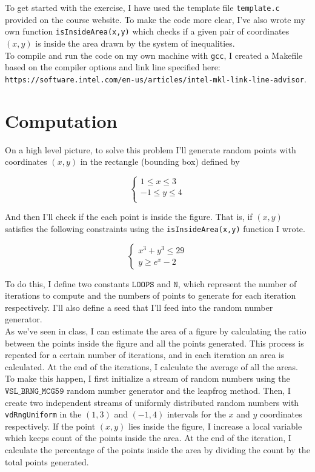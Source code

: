 \documentclass{article}
\newcommand{\code}{\texttt}
\begin{document}
To get started with the exercise, I have used the template file \code{template.c} provided on the course website. To make the code more clear, I've also wrote my own function \code{isInsideArea(x,y)} which checks if a given pair of coordinates $(x, y)$ is inside the area drawn by the system of inequalities.\\

To compile and run the code on my own machine with \code{gcc}, I created a Makefile based on the compiler options and link line specified here:\\ \code{https://software.intel.com/en-us/articles/intel-mkl-link-line-advisor}.

\section{Computation}
On a high level picture, to solve this problem I'll generate random points with coordinates $(x, y)$ in the rectangle (bounding box) defined by

$$
\begin{cases}
1 \le x \le 3 \\
-1\le y \le 4 \\  
\end{cases}$$

And then I'll check if the each point is inside the figure. That is, if $(x, y)$ satisfies the following constraints using the \code{isInsideArea(x,y)} function I wrote.

$$
\begin{cases}
x^3+y^3\le 29 \\
y \ge e^x -2
\end{cases}$$

To do this, I define two constants $\code{LOOPS}$ and $\code{N}$, which represent the number of iterations to compute and the numbers of points to generate for each iteration respectively. I'll also define a seed that I'll feed into the random number generator.\\

As we've seen in class, I can estimate the area of a figure by calculating the ratio between the points inside the figure and all the points generated. This process is repeated for a certain number of iterations, and in each iteration an area is calculated. At the end of the iterations, I calculate the average of all the areas.\\

To make this happen, I first initialize a stream of random numbers using the $\code{VSL\_BRNG\_MCG59}$ random number generator and the leapfrog method. Then, I create two independent streams of uniformly distributed random numbers with \code{vdRngUniform} in the $(1,3)$ and $(-1,4)$ intervals for the $x$ and $y$ coordinates respectively. If the point $(x, y)$ lies inside the figure, I increase a local variable which keeps count of the points inside the area. At the end of the iteration, I calculate the percentage of the points inside the area by dividing the count by the total points generated.\\
\end{document}
